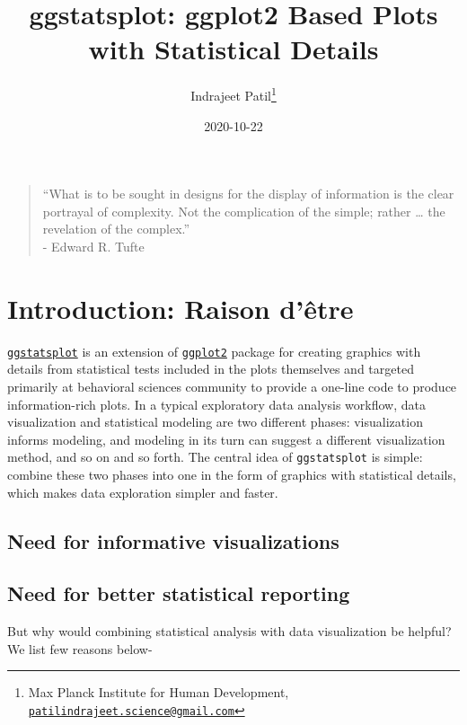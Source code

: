 \documentclass[
]{article}
\title{ggstatsplot: ggplot2 Based Plots with Statistical Details}
\author{Indrajeet Patil\footnote{Max Planck Institute for Human Development, \href{mailto:patilindrajeet.science@gmail.com}{\nolinkurl{patilindrajeet.science@gmail.com}}}}
\date{2020-10-22}
\begin{document}
\maketitle

{
\hypersetup{linkcolor=}
\setcounter{tocdepth}{2}
\tableofcontents
}
\begin{quote}
``What is to be sought in designs for the display of information is the clear
portrayal of complexity. Not the complication of the simple; rather \ldots{} the
revelation of the complex.''\\
- Edward R. Tufte
\end{quote}

\hypertarget{introduction-raison-duxeatre}{%
\section{Introduction: Raison d'être}\label{introduction-raison-duxeatre}}

\href{https://indrajeetpatil.github.io/ggstatsplot/}{\texttt{ggstatsplot}} is an extension
of \href{https://github.com/tidyverse/ggplot2}{\texttt{ggplot2}} package for creating
graphics with details from statistical tests included in the plots themselves
and targeted primarily at behavioral sciences community to provide a one-line
code to produce information-rich plots. In a typical exploratory data analysis
workflow, data visualization and statistical modeling are two different phases:
visualization informs modeling, and modeling in its turn can suggest a
different visualization method, and so on and so forth. The central idea of
\texttt{ggstatsplot} is simple: combine these two phases into one in the form of
graphics with statistical details, which makes data exploration simpler and
faster.

\hypertarget{need-for-informative-visualizations}{%
\subsection{Need for informative visualizations}\label{need-for-informative-visualizations}}

\hypertarget{need-for-better-statistical-reporting}{%
\subsection{Need for better statistical reporting}\label{need-for-better-statistical-reporting}}

But why would combining statistical analysis with data visualization be helpful?
We list few reasons below-
\end{document}
